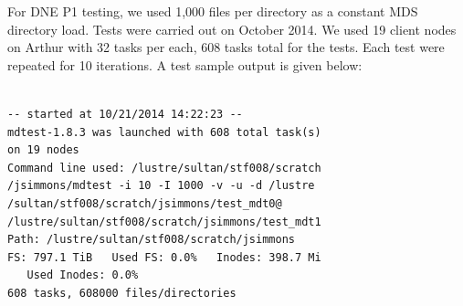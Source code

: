 \documentclass[conference,compsoc]{IEEEtran}
\begin{document}
For DNE P1 testing, we used 1,000 files per directory as a constant MDS
directory load. Tests were carried out on October 2014. We used 19 client nodes
on Arthur with 32 tasks per each, 608 tasks total for the tests. Each test were
repeated for 10 iterations. A test sample output is given below:

\begin{lstlisting}

-- started at 10/21/2014 14:22:23 --
mdtest-1.8.3 was launched with 608 total task(s) 
on 19 nodes
Command line used: /lustre/sultan/stf008/scratch
/jsimmons/mdtest -i 10 -I 1000 -v -u -d /lustre
/sultan/stf008/scratch/jsimmons/test_mdt0@
/lustre/sultan/stf008/scratch/jsimmons/test_mdt1
Path: /lustre/sultan/stf008/scratch/jsimmons
FS: 797.1 TiB   Used FS: 0.0%   Inodes: 398.7 Mi
   Used Inodes: 0.0%
608 tasks, 608000 files/directories


\end{lstlisting}
\end{document}
